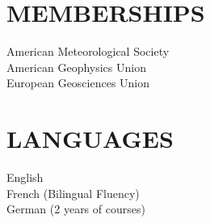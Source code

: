 \documentclass[overlapped]{res}
\begin{document}
\begin{resume}
\section{MEMBERSHIPS}            
                {American Meteorological Society} \\
                {American Geophysics Union} \\
                {European Geosciences Union}

\section{LANGUAGES}
                English \\
                French (Bilingual Fluency) \\
                German (2 years of courses) 

\end{resume}
\end{document}
